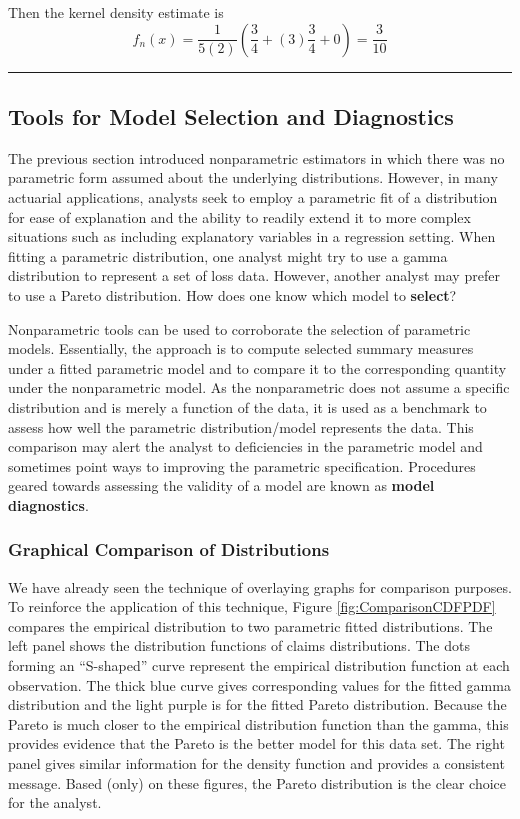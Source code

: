 \documentclass[]{book}
\theoremstyle{definition}
\theoremstyle{definition}
\theoremstyle{definition}
\theoremstyle{remark}
\begin{document}
Then the kernel density estimate is
\[f_n(x) = \frac{1}{5(2)}\left( \frac{3}{4} + (3) \frac{3}{4} + 0 \right) = \frac{3}{10}\]

\begin{center}\rule{0.5\linewidth}{\linethickness}\end{center}

\subsection{Tools for Model Selection and
Diagnostics}\label{S:MS:ToolsModelSelection}

The previous section introduced nonparametric estimators in which there
was no parametric form assumed about the underlying distributions.
However, in many actuarial applications, analysts seek to employ a
parametric fit of a distribution for ease of explanation and the ability
to readily extend it to more complex situations such as including
explanatory variables in a regression setting. When fitting a parametric
distribution, one analyst might try to use a gamma distribution to
represent a set of loss data. However, another analyst may prefer to use
a Pareto distribution. How does one know which model to \textbf{select}?

Nonparametric tools can be used to corroborate the selection of
parametric models. Essentially, the approach is to compute selected
summary measures under a fitted parametric model and to compare it to
the corresponding quantity under the nonparametric model. As the
nonparametric does not assume a specific distribution and is merely a
function of the data, it is used as a benchmark to assess how well the
parametric distribution/model represents the data. This comparison may
alert the analyst to deficiencies in the parametric model and sometimes
point ways to improving the parametric specification. Procedures geared
towards assessing the validity of a model are known as \textbf{model
diagnostics}.

\subsubsection{Graphical Comparison of
Distributions}\label{S:MS:GraphComparison}

We have already seen the technique of overlaying graphs for comparison
purposes. To reinforce the application of this technique, Figure
\ref{fig:ComparisonCDFPDF} compares the empirical distribution to two
parametric fitted distributions. The left panel shows the distribution
functions of claims distributions. The dots forming an ``S-shaped''
curve represent the empirical distribution function at each observation.
The thick blue curve gives corresponding values for the fitted gamma
distribution and the light purple is for the fitted Pareto distribution.
Because the Pareto is much closer to the empirical distribution function
than the gamma, this provides evidence that the Pareto is the better
model for this data set. The right panel gives similar information for
the density function and provides a consistent message. Based (only) on
these figures, the Pareto distribution is the clear choice for the
analyst.
\end{document}
